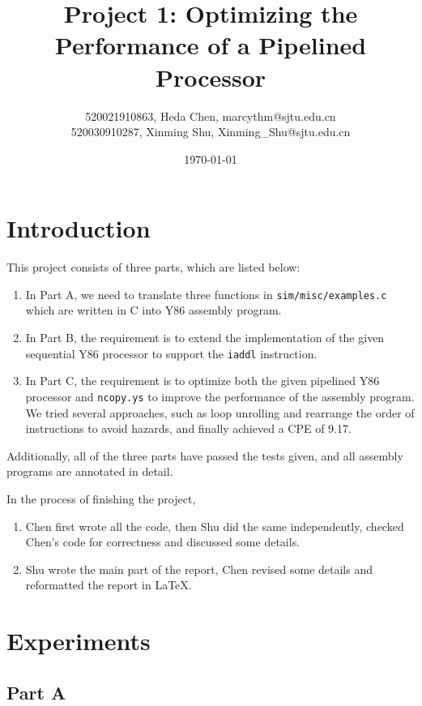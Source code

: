 \documentclass{article}
\title{\textbf{Project 1: Optimizing the Performance of a Pipelined Processor}} %
\author{520021910863, Heda Chen, marcythm@sjtu.edu.cn \\
        520030910287, Xinming Shu, Xinming\_Shu@sjtu.edu.cn} %
\date{\today} %
\begin{document}
\maketitle{} %

\section{Introduction}

This project consists of three parts, which are listed below:

\begin{enumerate}
  \item In Part A, we need to translate three functions in \verb|sim/misc/examples.c| which are written in C into Y86 assembly program.
  \item In Part B, the requirement is to extend the implementation of the given sequential Y86 processor to support the \verb|iaddl| instruction.
  \item In Part C, the requirement is to optimize both the given pipelined Y86 processor and \verb|ncopy.ys| to improve the performance of the assembly program. We tried several approaches, such as loop unrolling and rearrange the order of instructions to avoid hazards, and finally achieved a CPE of 9.17.
\end{enumerate}

Additionally, all of the three parts have passed the tests given, and all assembly programs are annotated in detail.

In the process of finishing the project,

\begin{enumerate}
  \item Chen first wrote all the code, then Shu did the same independently, checked Chen's code for correctness and discussed some details.
  \item Shu wrote the main part of the report, Chen revised some details and reformatted the report in \LaTeX.
\end{enumerate}

\section{Experiments}

\subsection{Part A}
\end{document}
